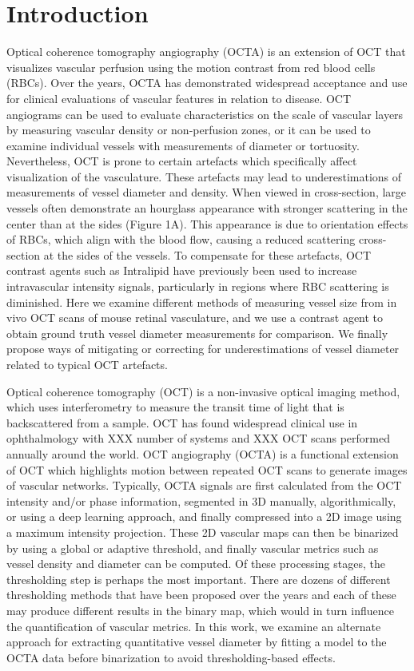 \documentclass{optica-article}
\begin{document}
\section{Introduction}
Optical coherence tomography angiography (OCTA) is an extension of OCT that visualizes vascular perfusion using the motion contrast from red blood cells (RBCs).  Over the years, OCTA has demonstrated widespread acceptance and use for clinical evaluations of vascular features in relation to disease\cite{javedOpticalCoherenceTomography2023}.  OCT angiograms can be used to evaluate characteristics on the scale of vascular layers by measuring vascular density or non-perfusion zones, or it can be used to examine individual vessels with measurements of diameter or tortuosity.  Nevertheless, OCT is prone to certain artefacts which specifically affect visualization of the vasculature.  These artefacts may lead to underestimations of measurements of vessel diameter and density.  When viewed in cross-section, large vessels often demonstrate an hourglass appearance with stronger scattering in the center than at the sides (Figure 1A).  This appearance is due to orientation effects of RBCs, which align with the blood flow, causing a reduced scattering cross-section at the sides of the vessels.  To compensate for these artefacts, OCT contrast agents such as Intralipid have previously been used to increase intravascular intensity signals, particularly in regions where RBC scattering is diminished.  Here we examine different methods of measuring vessel size from in vivo OCT scans of mouse retinal vasculature, and we use a contrast agent to obtain ground truth vessel diameter measurements for comparison.  We finally propose ways of mitigating or correcting for underestimations of vessel diameter related to typical OCT artefacts.

Optical coherence tomography (OCT) is a non-invasive optical imaging method, which uses interferometry to measure the transit time of light that is backscattered from a sample.  OCT has found widespread clinical use in ophthalmology with XXX number of systems and XXX OCT scans performed annually around the world.  OCT angiography (OCTA) is a functional extension of OCT which highlights motion between repeated OCT scans to generate images of vascular networks.  Typically, OCTA signals are first calculated from the OCT intensity and/or phase information, segmented in 3D manually, algorithmically, or using a deep learning approach, and finally compressed into a 2D image using a maximum intensity projection.  These 2D vascular maps can then be binarized by using a global or adaptive threshold, and finally vascular metrics such as vessel density and diameter can be computed.  Of these processing stages, the thresholding step is perhaps the most important.  There are dozens of different thresholding methods that have been proposed over the years and each of these may produce different results in the binary map, which would in turn influence the quantification of vascular metrics. In this work, we examine an alternate approach for extracting quantitative vessel diameter by fitting a model to the OCTA data before binarization to avoid thresholding-based effects.
\end{document}
